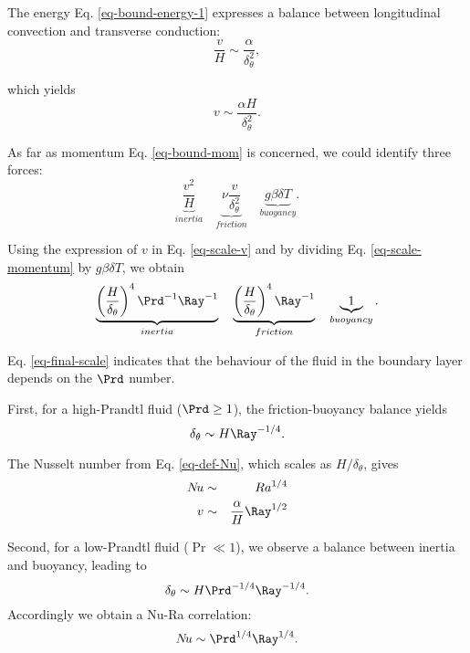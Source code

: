 \noindent The energy Eq. \ref{eq-bound-energy-1} expresses a balance between longitudinal convection and transverse conduction:
\begin{equation}
	\frac{v}{H} \sim \frac{\alpha}{\delta_\theta^2},
\end{equation}

\noindent which yields
\begin{equation} \label{eq-scale-v}
	v \sim \frac{\alpha H}{\delta_\theta^2}.
\end{equation}

\noindent As far as momentum Eq. \ref{eq-bound-mom} is concerned, we could identify three forces:
\begin{equation} \label{eq-scale-momentum}
	\underbrace{\frac{v^2}{H}}_{inertia} \quad \underbrace{\nu \frac{v}{\delta_\theta^2}}_{friction} \quad \underbrace{g \beta \delta T}_{buoyancy}.
\end{equation}

\noindent Using the expression of $v$ in Eq. \ref{eq-scale-v} and by dividing Eq. \ref{eq-scale-momentum} by $g \beta \delta T$, we obtain
\begin{equation} \label{eq-final-scale}
	\underbrace{\left( \frac{H}{\delta_\theta} \right)^4 \Prd ^{-1} \Ray^{-1}}_{inertia} \quad  \underbrace{\left( \frac{H}{\delta_\theta} \right)^4 \Ray^{-1}}_{friction} \quad \underbrace{1}_{buoyancy}.
\end{equation}

\noindent Eq. \ref{eq-final-scale} indicates that the behaviour of the fluid in the boundary layer depends on the $\Prd$ number.

\noindent First, for a high-Prandtl fluid ($\Prd \geq 1$), the friction-buoyancy balance yields
\begin{equation} \label{eq-scale-nbd-high-Pr}
	\delta_\theta \sim H \Ray^{-1/4}.
\end{equation}

\noindent The Nusselt number from Eq. \ref{eq-def-Nu}, which scales as $H/\delta_\theta$, gives
\begin{eqnarray} 
	N\!u & \sim & Ra^{1/4} \\
	v & \sim & \frac{\alpha}{H} \Ray^{1/2}
\end{eqnarray}

\noindent Second, for a low-Prandtl fluid ($\Pr \ll 1$), we observe a balance between inertia and buoyancy, leading to
\begin{equation} \label{eq-corr-Low-Pr}
	\delta_\theta \sim H \Prd^{-1/4} \Ray^{-1/4}.
\end{equation}
Accordingly we obtain a Nu-Ra correlation:
\begin{equation}
	N\!u \sim \Prd^{1/4} \Ray^{1/4}.
\end{equation}

